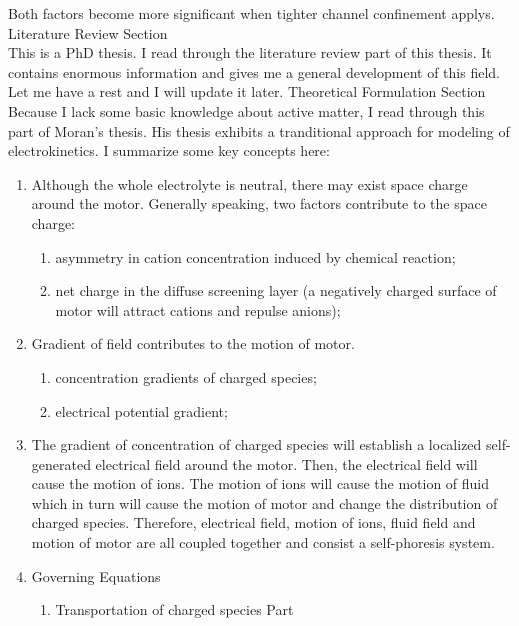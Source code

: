 \documentclass[fontsize=11pt, %
                             paper=a4, %
                             twoside, %
                             captions=tableheading,
                             index=totoc,
                             hyperref]{labbook}
\begin{document}
\begin{addmargin}[4cm]{0cm}
\begin{itemize}
\end{itemize}
Both factors become more significant when tighter channel confinement applys.
Literature Review Section\\
This is a PhD thesis. I read through the literature review part of this thesis. It contains enormous information and gives me a general development of this field. Let me have a rest and I will update it later.
Theoretical Formulation Section\\
Because I lack some basic knowledge about active matter, I read through this part of Moran's thesis\cite{Moran2013}. His thesis exhibits a tranditional approach for modeling of electrokinetics. I summarize some key concepts here:
\begin{enumerate}
\item
Although the whole electrolyte is neutral, there may exist space charge around the motor. Generally speaking, two factors contribute to the space charge:
\begin{enumerate}
\item
asymmetry in cation concentration induced by chemical reaction;
\item
net charge in the diffuse screening layer (a negatively charged surface of motor will attract cations and repulse anions);
\end{enumerate}
\item Gradient of field contributes to the motion of motor.
\begin{enumerate}
\item
concentration gradients of charged species;
\item
electrical potential gradient;
\end{enumerate}
\item
The gradient of concentration of charged species will establish a localized self-generated electrical field around the motor. Then, the electrical field will cause the motion of ions. The motion of ions will cause the motion of fluid which in turn will cause the motion of motor and change the distribution of charged species. Therefore, electrical field, motion of ions, fluid field and motion of motor are all coupled together and consist a self-phoresis system.
\item Governing Equations
\begin{enumerate}
\item
Transportation of charged species Part\\

\end{enumerate}
\end{enumerate}
\end{addmargin}
\end{document}
